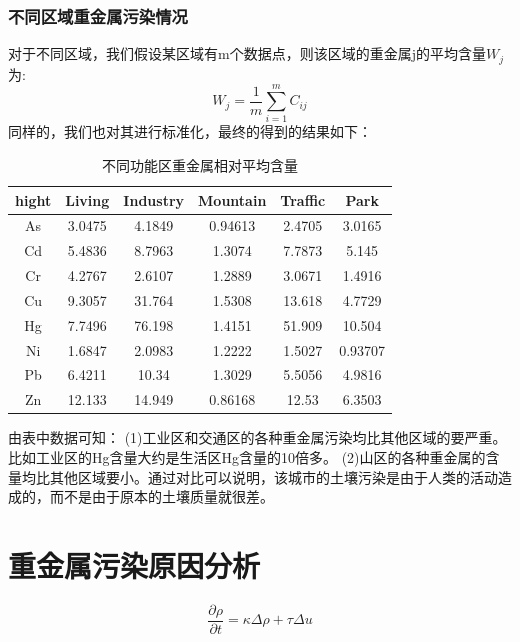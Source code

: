 \documentclass[a4paper]{article}
\begin{document}
\section{不同区域重金属污染情况}
对于不同区域，我们假设某区域有m个数据点，则该区域的重金属j的平均含量$W_j$为:
\begin{equation}
W_j=\frac{1}{m}\sum_{i=1}^m C_{ij}
\end{equation}
同样的，我们也对其进行标准化，最终的得到的结果如下：
\begin{table}[H]
		\centering
		\caption{不同功能区重金属相对平均含量}
		\label{average-contend}
		\begin{tabular}{c|ccccc}
			hight	  &    Living  &  Industry  &  Mountain  &  Traffic  &   Park    \\
			\hline
			As   & 3.0475  &  4.1849   &   0.94613   &  2.4705   &   3.0165      \\
    			Cd   & 5.4836  &  8.7963   &    1.3074   &  7.7873   &    5.145		\\
    			Cr   & 4.2767  &  2.6107   &    1.2889   &  3.0671   &   1.4916		\\
    			Cu   & 9.3057  &  31.764   &    1.5308   &  13.618   &   4.7729		\\
    			Hg   & 7.7496  &  76.198   &    1.4151   &  51.909   &   10.504		\\
    			Ni   & 1.6847  &  2.0983   &    1.2222   &  1.5027   &  0.93707		\\
    			Pb   & 6.4211  &   10.34   &    1.3029   &  5.5056   &   4.9816		\\
    			Zn   & 12.133  &  14.949   &   0.86168   &   12.53   &   6.3503		\\
		\end{tabular}
	\end{table}
由表中数据可知：
(1)工业区和交通区的各种重金属污染均比其他区域的要严重。比如工业区的Hg含量大约是生活区Hg含量的10倍多。
(2)山区的各种重金属的含量均比其他区域要小。通过对比可以说明，该城市的土壤污染是由于人类的活动造成的，而不是由于原本的土壤质量就很差。

\part{重金属污染原因分析}





\begin{equation}
\frac{\partial \rho}{\partial t} = \kappa \Delta \rho + \tau \Delta u
\end{equation}
\end{document}
